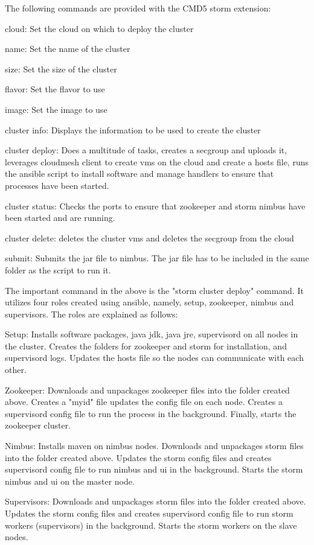 \documentclass[9pt,twocolumn,twoside]{../../styles/osajnl}
\begin{document}
The following commands are provided with the CMD5 storm extension:
\begin{description}
\item cloud: Set the cloud on which to deploy the cluster
\item name: Set the name of the cluster
\item size: Set the size of the cluster
\item flavor: Set the flavor to use
\item image: Set the image to use
\item cluster info: Displays the information to be used to create the cluster
\item cluster deploy: Does a multitude of tasks, creates a secgroup
  and uploads it, leverages cloudmesh client to create vms on the
  cloud and create a hosts file, runs the ansible script to install
  software and manage handlers to ensure that processes have been
  started.
\item cluster status: Checks the ports to ensure that zookeeper and
  storm nimbus have been started and are running.
\item cluster delete: deletes the cluster vms and deletes the secgroup
  from the cloud
\item submit: Submits the jar file to nimbus. The jar file has to be
  included in the same folder as the script to run it.
\end{description}

The important command in the above is the "storm cluster deploy"
command. It utilizes four roles created using ansible, namely, setup,
zookeeper, nimbus and supervisors. The roles are explained as follows:
\begin{description}
\item Setup: Installs software packages, java jdk, java jre,
  supervisord on all nodes in the cluster. Creates the folders for
  zookeeper and storm for installation, and supervisord logs. Updates
  the hosts file so the nodes can communicate with each other.
\item Zookeeper: Downloads and unpackages zookeeper files into the
  folder created above. Creates a "myid" file updates the config file
  on each node. Creates a supervisord config file to run the process
  in the background. Finally, starts the zookeeper cluster.
\item Nimbus: Installs maven on nimbus nodes. Downloads and unpackages
  storm files into the folder created above. Updates the storm config
  files and creates supervisord config file to run nimbus and ui in
  the background. Starts the storm nimbus and ui on the master node.
\item Supervisors: Downloads and unpackages storm files into the
  folder created above. Updates the storm config files and creates
  supervisord config file to run storm workers (supervisors) in the
  background. Starts the storm workers on the slave nodes.
\end{description}
\end{document}
